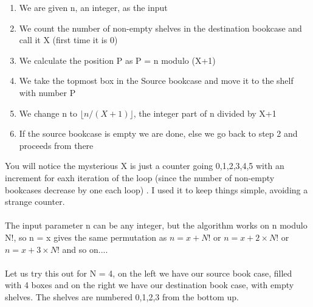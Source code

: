 \documentclass{article} %
\begin{document}
\begin{enumerate}
\item 
We are given n, an integer, as the input
\item We count the number of non-empty shelves in the destination bookcase and call it X   (first time it is 0)
\item We calculate the position P as P = n modulo (X+1)
\item We take the topmost box in the Source bookcase and move it to the shelf with number P
\item  We change n to \( \lfloor n/( X+1)\rfloor  \), the integer part of  n divided by X+1
\item If the source bookcase is empty we are done, else we go back to step 2 and proceeds from there
\end{enumerate}
You will notice the mysterious X is just a counter going 0,1,2,3,4,5 with an increment for eaxh iteration of the loop (since the number of non-empty bookcases decrease by one each loop) . I used it to keep things simple, avoiding  a strange counter.
\\
\\
The input parameter n can be any integer, but the algorithm works on n modulo N!, so n = x gives the same permutation as \(n = x + N! \) or \( n =x +  2 \times N!\) or   \( n = x +  3  \times N!\) and so on....
\\
\\
\noindent Let us try this out for N = 4,
on the left we have our source book case, filled with 4 boxes  and on the right we have our destination book case, with empty shelves.  The shelves are numbered  0,1,2,3 from the bottom up.
\\
\\
\\
\end{document}
